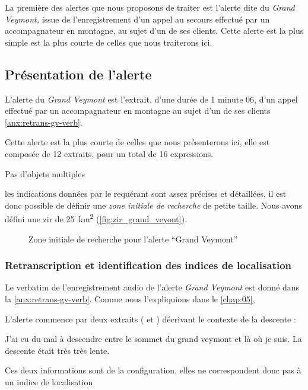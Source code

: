 La première des alertes que nous proposons de traiter est l'alerte
dite du \emph{Grand Veymont,} issue de l'enregistrement d'un appel au
secours effectué par un accompagnateur en montagne, au sujet d'un de
ses clients.
%
Cette alerte est la plus simple est la plus courte de celles que nous
traiterons ici.

\subsection{Présentation de l'alerte}
\label{subsec:9-2-1}

L'alerte du \emph{Grand Veymont} est l'extrait, d'une durée de 1
minute 06, d'un appel effectué par un accompagnateur en montagne au
sujet d'un de ses clients \autoref{anx:retrans-gv-verb}.


Cette alerte est la plus courte de celles que nous présenterons ici,
elle est composée de 12 extraits, pour un total de 16 expressions.



Pas d'objets multiples

les indications données par le requérant sont assez précises et
détaillées, il est donc possible de définir une \emph{zone initiale de
  recherche} de petite taille. Nous avons défini une \ac{zir} de
\SI{25}{\kilo\meter\squared} (\autoref{fig:zir_grand_veyont}).

\begin{figure}
  \centering
  
  \caption{Zone initiale de recherche pour l'alerte \enquote{Grand Veymont}}
  \label{fig:zir_grand_veyont}
\end{figure}


\subsubsection{Retranscription et identification des indices de localisation}
\label{subsec:9-2-1-1}


Le verbatim de l'enregistrement audio de l'alerte \emph{Grand Veymont}
est donné dans la \autoref{anx:retrans-gv-verb}.
%
Comme nous l’expliquions dans le \autoref{chap:05}, 


L'alerte commence par deux extraits ( et ) décrivant
le contexte de la descente :
%
\begin{dialogue}
  \Req {} J'ai eu du mal à descendre entre le sommet du grand
veymont et là où je suis.  La descente était très très lente.
\end{dialogue}
%
Ces deux informations sont de la configuration, elles ne correspondent
donc pas à un indice de localisation





